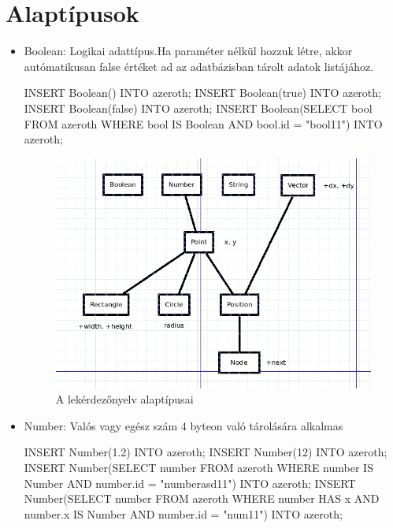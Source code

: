
\section{Alaptípusok}

\begin{itemize}

\item Boolean: Logikai adattípus.Ha paraméter nélkül hozzuk létre, akkor autómatikusan false értéket ad az adatbázisban tárolt adatok listájához.

\begin{sql}
INSERT Boolean() INTO azeroth;
INSERT Boolean(true) INTO azeroth; 
INSERT Boolean(false) INTO azeroth;
INSERT Boolean(SELECT bool FROM azeroth WHERE bool IS Boolean AND bool.id = "bool11") INTO azeroth;
\end{sql}



\begin{figure}[htb]
\begin{center}
    \includegraphics[scale=0.5]{images/types}
    \caption{A lekérdezőnyelv alaptípusai}
    \label{fig:types}
\end{center}
\end{figure}

\item Number: Valós vagy egész szám 4 byteon való tárolására alkalmas
\begin{sql}
INSERT Number(1.2) INTO azeroth;
INSERT Number(12) INTO azeroth;
INSERT Number(SELECT number FROM azeroth WHERE number IS Number AND number.id = "numberasd11") INTO azeroth;
INSERT Number(SELECT number FROM azeroth WHERE number HAS x AND number.x IS Number AND number.id = "num11") INTO azeroth;
\end{sql}




\end{itemize}
